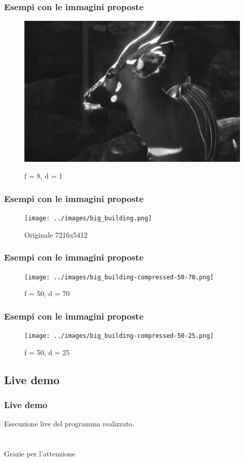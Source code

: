 \documentclass{beamer}
\begin{document}
\begin{frame}
	\frametitle{Esempi con le immagini proposte}
	\begin{figure}
		{\includegraphics[width=.8\linewidth]{../images/deer-compressed-8-1.png}}
		\caption{f = 8, d = 1}
	\end{figure}
\end{frame}

\begin{frame}
	\frametitle{Esempi con le immagini proposte}
	\begin{figure}
		{\texttt{[image: ../images/big\_building.png]}}
		\caption{Originale 7216x5412}
	\end{figure}
\end{frame}

\begin{frame}
	\frametitle{Esempi con le immagini proposte}
	\begin{figure}
		{\texttt{[image: ../images/big\_building-compressed-50-70.png]}}
		\caption{f = 50, d = 70}
	\end{figure}
\end{frame}

\begin{frame}
	\frametitle{Esempi con le immagini proposte}
	\begin{figure}
		{\texttt{[image: ../images/big\_building-compressed-50-25.png]}}
		\caption{f = 50, d = 25}
	\end{figure}
\end{frame}

\subsection{Live demo}
\begin{frame}
\frametitle{Live demo}
Esecuzione live del programma realizzato.
\end{frame}

\section*{}
\begin{frame}
\Huge{\centerline{Grazie per l'attenzione}}
\end{frame}
\end{document}
